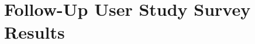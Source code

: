 \begin{center}
\end{center}


\chapter{Follow-Up User Study Survey Results}
\label{appendix:follow-up-user-study-survey-results}


